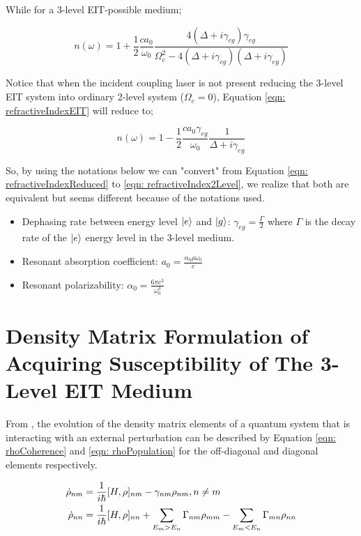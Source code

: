 While for a 3-level EIT-possible medium;

\begin{equation}
    n(\omega) = 1 + \frac{1}{2} \frac{c a_{0}}{\omega_{0}} \frac{4(\Delta + i\gamma_{cg})\gamma_{eg}}{\Omega_{c}^{2} - 4(\Delta + i\gamma_{cg})(\Delta + i\gamma_{eg})}
    \label{eqn: refractiveIndexEIT}
\end{equation}

Notice that when the incident coupling laser is not present reducing the 3-level EIT system into ordinary 2-level system ($\Omega_{c} = 0$), Equation \ref{eqn: refractiveIndexEIT} will reduce to;

\begin{equation}
    n(\omega) = 1 - \frac{1}{2} \frac{c a_{0} \gamma_{eg}}{\omega_{0}} \frac{1}{\Delta + i\gamma_{eg}}
    \label{eqn: refractiveIndexReduced}
\end{equation}

\newpage

So, by using the notations below we can "convert" from Equation \ref{eqn: refractiveIndexReduced} to \ref{eqn: refractiveIndex2Level}, we realize that both are equivalent but seems different because of the notations used.

\begin{itemize}
    \item Dephasing rate between energy level $\ket{e}$ and $\ket{g}$: $\gamma_{eg} = \frac{\Gamma}{2}$ where $\Gamma$ is the decay rate of the $\ket{e}$ energy level in the 3-level medium. 
    \item Resonant absorption coefficient: $a_{0} = \frac{\alpha_{0} \rho \omega_{0}}{c}$
    \item Resonant polarizability: $\alpha_{0} = \frac{6\pi c^{3}}{\omega_{0}^{3}}$
\end{itemize}


\section{Density Matrix Formulation of Acquiring Susceptibility of The 3-Level EIT Medium}
From \cite{boyd2020nonlinear}, the evolution of the density matrix elements of a quantum system that is interacting with an external perturbation can be described by Equation \ref{eqn: rhoCoherence} and \ref{eqn: rhoPopulation} for the off-diagonal and diagonal elements respectively.

\begin{align}
    \Dot{\rho}_{nm} &= \frac{1}{i\hbar} [H, \rho]_{nm} - \gamma_{nm} \rho_{nm}, \space n \neq m \label{eqn: rhoCoherence}\\
    \Dot{\rho}_{nn} &= \frac{1}{i\hbar} [H, \rho]_{nn} + \sum_{E_{m} > E_{n}} \Gamma_{nm}\rho_{mm} - \sum_{E_{m} < E_{n}} \Gamma_{mn} \rho_{nn} \label{eqn: rhoPopulation}
\end{align} 

